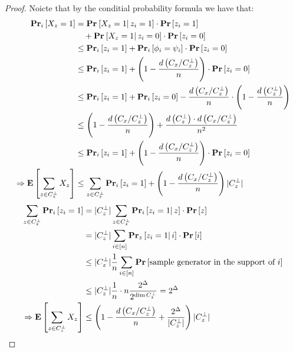 \documentclass[manuscript,screen,review]{acmart}
\begin{document}
\newcommand{\dxnw}{  1 - \frac{d\left( C_{x}/C_{z}^{\perp} \right)}{n} } 
\newcommand{\dxn}{ \left( \dxnw \right)} 
\newcommand{\czp}{C_{z}^{\perp}}
\newcommand{\czpa}{|\czp |}
\newcommand{\forczp}[2]{ \sum_{#1 \in \czp}{#2} }  
\newcommand{\dismul}{  \frac{ d\left( \czp  \right) \cdot   d\left( C_{x}/C_{z}^{\perp} \right)}{n^{2} }}
\begin{proof}
  Noicte that by the conditial probability formula we have that: 
  \begin{equation*}
    \begin{split}
      \prbm{X_{z}=1}{i} &=  \prbcprb{}{X_{z}=1}{z_{i}=1}  \\ 
      & \ \ \ + \prbcprb{}{X_{z}=1}{z_{i}=0} \\ 
      & \le \prbm{z_{i}= 1 }{i} +  \prbm{\phi_{i} = \psi_{i}  }{i} \cdot \prb{z_{i}= 0 }  \\ 
      & \le \prbm{z_{i}= 1 }{i} +  \dxn \cdot \prb{z_{i}= 0 }  \\
      & \le \prbm{z_{i}= 1 }{i} + \prbm{z_{i}= 0 }{i} -   \frac{d\left( C_{x}/C_{z}^{\perp} \right)}{n} \cdot \left( 1 - \frac{d\left( \czp \right)}{n}   \right) \\ 
      & \le \dxn + \dismul \\ 
      & \le \prbm{z_{i}= 1 }{i} + \dxn \cdot \prb{z_{i} = 0 } \\ 
      \Rightarrow  \expp{\forczp{z}{X_{z}}}  & \le \forczp{z}{\prbm{z_{i}= 1 }{i}} + \dxn \czpa    
    \end{split}
  \end{equation*}
\begin{equation*}
  \begin{split}
    \forczp{z}{\prbm{z_{i}= 1 }{i}} & = \czpa \forczp{z}{\prbcprb{i}{z_{i}= 1 }{z}} \\
    & =   \czpa \sum_{i \in [n]}{\prbcprb{z}{z_{i}= 1 }{i}} \\
    & \le \czpa \frac{1}{n} \sum_{i\in [n]}{ \prb{ \text{sample generator in the support of } i  } }\\
    & \le \czpa \frac{1}{n} \cdot n \frac{2^{\Delta}}{2^{\dim \czp}} = 2^{\Delta} \\ 
    \Rightarrow  \expp{\forczp{z}{X_{z}}}  & \le \left( \dxnw + \frac{2^{\Delta}}{\czpa}  \right)\czpa
  \end{split}
\end{equation*}


\end{proof}
\printbibliography
\end{document}
